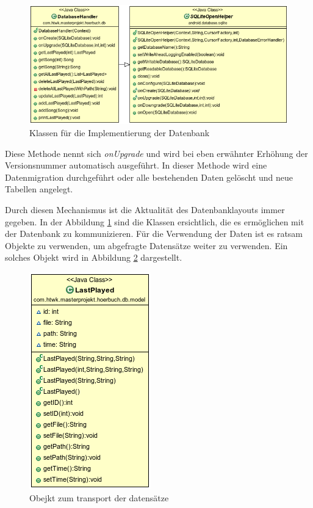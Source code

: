 \begin{figure}
\begin{center}
\includegraphics[scale=0.7]{images/database}
\caption{Klassen für die Implementierung der Datenbank}
\label{database}
\end{center}
\end{figure}

Diese Methode nennt sich \textit{onUpgrade} und wird bei eben erwähnter Erhöhung der Versionsnummer automatisch ausgeführt. In dieser Methode wird eine Datenmigration durchgeführt oder alle bestehenden Daten gelöscht und neue Tabellen angelegt.

Durch diesen Mechanismus ist die Aktualität des Datenbanklayouts immer gegeben. In der Abbildung \ref{database} sind die Klassen ersichtlich, die es ermöglichen mit der Datenbank zu kommunizieren. Für die Verwendung der Daten ist es ratsam Objekte zu verwenden, um abgefragte Datensätze weiter zu verwenden. Ein solches Objekt wird in Abbildung \ref{dbmodel} dargestellt.

\begin{figure}
\begin{center}
\includegraphics[scale=0.7]{images/dbmodel}
\caption{Obejkt zum transport der datensätze}
\label{dbmodel}
\end{center}
\end{figure}

